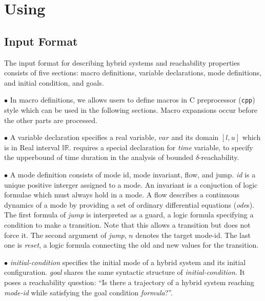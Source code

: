 \section{Using \dReach{}}\label{sec:using-dreach}
\subsection{Input Format}\label{sec:input-format}
The input format for describing hybrid systems and reachability properties consists of five
sections: macro definitions, variable declarations, mode definitions,
and initial condition, and goals. 

\noindent$\bullet$
In macro definitions, we allows users to define macros in C
preprocessor (\texttt{cpp}) style which can be used in the following
sections. Macro expansions occur before the other parts are processed.

\noindent$\bullet$
	A variable declaration specifies a real variable, $var$ and its domain
$[l, u]$ which is in Real interval $\mathbb{IR}$. \drh{} requires a
special declaration for \textit{time} variable, to specify the
upperbound of time duration in the analysis of bounded
$\delta$-reachability.


\noindent$\bullet$ A mode definition consists of mode id, mode invariant, flow, and jump.
\textit{id} is a unique positive interger assigned to a mode. An
invariant is a conjuction of logic formulae which must always hold in
a mode. A flow describes a continuous dynamics of a mode by providing
a set of ordinary differential equations (\textit{ode}s). The first
formula of \textit{jump} is interpreted as a guard, a logic formula
specifying a condition to make a transition. Note that this allows a
transition but does not force it. The second argument of
\textit{jump}, $n$ denotes the target mode-id. The last one is
\textit{reset}, a logic formula connecting the old and new values for
the transition.

\noindent$\bullet$ \textit{initial-condition} specifies the initial mode of a hybrid
system and its initial configuration. \textit{goal} shares the same
syntactic structure of \textit{initial-condition}. It poses a
reachability question: ``Is there a trajectory of a hybrid system
reaching \textit{mode-id} while satisfying the goal condition
\textit{formula}?''.

